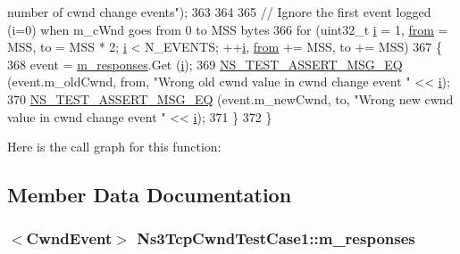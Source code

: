 \begin{DoxyCode}
{       number of cwnd change events"});
363 
364 
365   \textcolor{comment}{// Ignore the first event logged (i=0) when m\_cWnd goes from 0 to MSS bytes}
366   \textcolor{keywordflow}{for} (uint32\_t \hyperlink{bernuolliDistribution_8m_a6f6ccfcf58b31cb6412107d9d5281426}{i} = 1, \hyperlink{lte__amc_8m_a1b4c81ff74eb1a626b5ade44c81004b3}{from} = MSS, to = MSS * 2; \hyperlink{bernuolliDistribution_8m_a6f6ccfcf58b31cb6412107d9d5281426}{i} < N\_EVENTS; ++\hyperlink{bernuolliDistribution_8m_a6f6ccfcf58b31cb6412107d9d5281426}{i}, \hyperlink{lte__amc_8m_a1b4c81ff74eb1a626b5ade44c81004b3}{from} += MSS, to += MSS)
367     \{
368       \textcolor{keyword}{event} = \hyperlink{classNs3TcpCwndTestCase1_af29c36f15173cf8f986304e2a593f021}{m\_responses}.Get (\hyperlink{bernuolliDistribution_8m_a6f6ccfcf58b31cb6412107d9d5281426}{i});
369       \hyperlink{group__testing_ga2a9d78cffb3db8e867c35fff0b698cf5}{NS\_TEST\_ASSERT\_MSG\_EQ} (event.m\_oldCwnd, from, \textcolor{stringliteral}{"Wrong old cwnd value in cwnd
       change event "} << \hyperlink{bernuolliDistribution_8m_a6f6ccfcf58b31cb6412107d9d5281426}{i});
370       \hyperlink{group__testing_ga2a9d78cffb3db8e867c35fff0b698cf5}{NS\_TEST\_ASSERT\_MSG\_EQ} (event.m\_newCwnd, to, \textcolor{stringliteral}{"Wrong new cwnd value in cwnd change
       event "} << \hyperlink{bernuolliDistribution_8m_a6f6ccfcf58b31cb6412107d9d5281426}{i});
371     \}
372 \}
\end{DoxyCode}


Here is the call graph for this function\+:




\subsection{Member Data Documentation}
\subsubsection[{\texorpdfstring{m\+\_\+responses}{m_responses}}]{$<${\bf Cwnd\+Event}$>$ Ns3\+Tcp\+Cwnd\+Test\+Case1\+::m\+\_\+responses\hspace{0.3cm}{\ttfamily [private]}}\hypertarget{classNs3TcpCwndTestCase1_af29c36f15173cf8f986304e2a593f021}{}\label{classNs3TcpCwndTestCase1_af29c36f15173cf8f986304e2a593f021}
